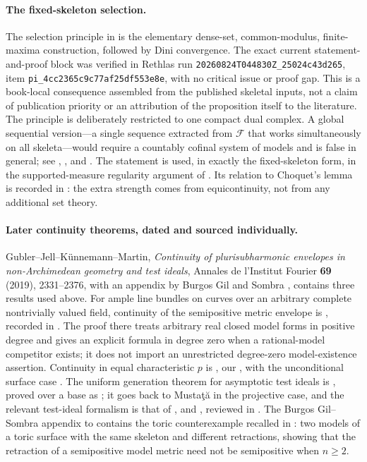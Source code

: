 \paragraph{The fixed-skeleton selection.}
The selection principle in  is the
elementary dense-set, common-modulus, finite-maxima construction, followed
by Dini convergence.  The exact current statement-and-proof block was
verified in Rethlas run
\nolinkurl{20260824T044830Z_25024c43d265}, item
\nolinkurl{pi_4cc2365c9c77af25df553e8e}, with no critical issue or proof gap.
This is a book-local consequence assembled from the published skeletal
inputs, not a claim of publication priority or an attribution of the
proposition itself to the literature.  The
principle is deliberately restricted to one compact dual complex.  A global
sequential version---a
single sequence extracted from \(\mathcal F\) that works simultaneously on
all skeleta---would require a countably cofinal system of models and is
false in general; see ,
, and .  The
statement is used, in exactly the fixed-skeleton form, in the
supported-measure regularity argument of
.  Its relation to Choquet's lemma is
recorded in : the extra strength comes
from equicontinuity, not from any additional set theory.

\paragraph{Later continuity theorems, dated and sourced individually.}
Gubler--Jell--K\"unnemann--Martin, \emph{Continuity of plurisubharmonic
envelopes in non-Archimedean geometry and test ideals}, Annales de
l'Institut Fourier \textbf{69} (2019), 2331--2376, with an appendix by
Burgos Gil and Sombra \cite{GJKM19}, contains three results used above.
For ample line bundles on curves over an arbitrary complete nontrivially
valued field, continuity of the semipositive metric envelope is
\cite[Theorem~1.1]{GJKM19}, recorded in
.  The proof there treats arbitrary real
closed model forms in positive degree and gives an explicit formula in
degree zero when a rational-model competitor exists; it does not import
an unrestricted degree-zero model-existence assertion.  Continuity in equal
characteristic \(p\) is \cite[Theorem~8.2]{GJKM19}, our
, with the unconditional
surface case \cite[Corollary~8.3]{GJKM19}.  The uniform generation theorem
for asymptotic test ideals is \cite[Theorem~1.3]{GJKM19}, proved over a base
as \cite[Theorem~4.6]{GJKM19}; it goes back to Mustaţă in the projective
case, and the relevant test-ideal formalism is that of
\cite{MustataTest}, \cite{HY03} and \cite{ST12}, reviewed in
.  The Burgos Gil--Sombra appendix to
\cite{GJKM19} contains the toric counterexample recalled in
: two models of a toric surface with the
same skeleton and different retractions, showing that the retraction of a
semipositive model metric need not be semipositive when \(n\geq2\).


